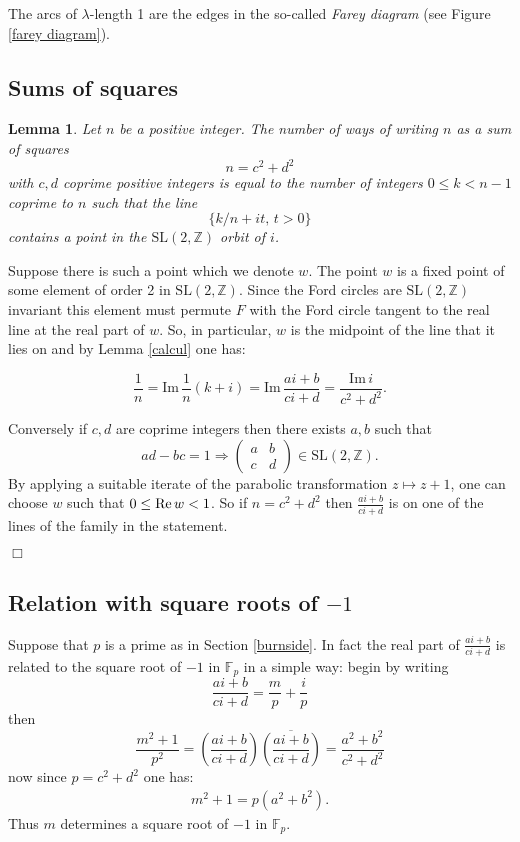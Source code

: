 \documentclass[12pt,a4paper]{amsart}
\newtheorem{lem}[thm]{Lemma}
\def\im{\mathrm{Im}\,}
\def\ZZ{\mathbb{Z}}
\def\fp{\mathbb{F}_p}
\def\sl2{\mathrm{SL}(2, \ZZ)}
\begin{document}
The arcs of $\lambda$-length 1 are the edges in the so-called 
\textit{Farey diagram} (see Figure \ref{farey diagram}).

\subsection{Sums of squares}

\begin{lem} \label{squares}
Let $n$ be a positive integer.
The number of  ways of writing $n$  as a  sum of squares
$$n = c^2 + d^2$$
with $c,d$ coprime positive  integers
is equal to the number of  integers $0 \leq k < n-1$ coprime to $n$
such that the line
$$\{  k/n + i t,\, t >0 \}$$
contains  a point in the $\sl2$  orbit of $i$.
\end{lem}


\proof  Suppose there is such  a point which we denote  $w$.
The point $w$ is a fixed point of some  element of order 2 in $\sl2$.
Since the Ford circles are $\sl2$ invariant
this element must permute $F$ with the Ford circle tangent 
to the real line  at the real part of $w$.
So, in particular, $w$ is the midpoint of the line 
that it lies on 
and by  Lemma \ref{calcul} one has:

$$\frac{1}{n} = \im \frac{1 }{n}(k + i)  
= \im  \frac{ai +b}{ci+d }
= \frac{\im i} {c^2 + d^2}.$$

Conversely if $c,d$ are coprime integers 
 then there exists $a,b$ such that
 $$ad - bc = 1 \Rightarrow  
 \begin{pmatrix}
 a & b \\
 c & d
 \end{pmatrix} \in \sl2.
$$
By applying a suitable iterate of the parabolic transformation 
$z \mapsto z + 1$,
one can choose $w$ such that $0 \leq \text{Re\,} w < 1$.
So if $n = c^2 + d^2$ then $\frac{ai +b}{ci+d }$
is on one of the lines of the family in the statement.

\hfill $\Box$


\subsection{Relation with square roots of $-1$}

Suppose that $p$ is a prime as in Section \ref{burnside}.
In fact the real part of 
$\frac{ai +b}{ci+d }$ is related to the square
root of $-1$ in $\fp$ in a simple way:
begin by writing
$$
 \frac{ai +b}{ci+d }
= \frac{m}{p} + \frac{i}{p}
$$
then 
$$
\frac{m^2 + 1}{p^2}   
= \left( \frac{ai +b}{ci+d }\right) 
\overline{\left( \frac{ai +b}{ci+d }\right)}
= \frac{a^2 +b^2}{c^2+d^2 }
$$
 now since $p = c^2 + d^2$ one has:
 \begin{eqnarray}
 m^2 + 1
=  p(a^2 + b^2).
\end{eqnarray}
Thus $m$ determines a square root of $-1$ in $\fp$. 
\end{document}
